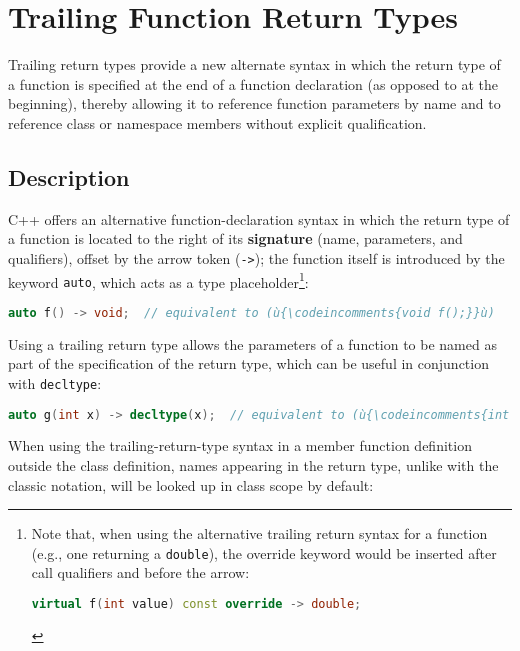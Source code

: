 \newpage
\section[Trailing Function Return Types]{Trailing Function Return Types}\label{trailing-function-return-types}


Trailing return types provide a new alternate syntax in which the return type of a function is specified at
the end of a function declaration (as opposed to at the beginning),
thereby allowing it to reference function parameters by name and to reference class
or namespace members without explicit qualification.

\subsection[Description]{Description}\label{description}

C++ offers an alternative function-declaration syntax in which the
return type of a function is located to the right of its
\textbf{signature} (name, parameters, and qualifiers), offset by the
arrow token (\texttt{->}); the function itself is introduced by the
keyword {\texttt{auto}}, which acts as a type placeholder\cprotect\footnote{Note that, when using the alternative trailing return syntax for a function (e.g., one returning a \texttt{double}), the override keyword would be inserted after call qualifiers and before the arrow:

\begin{lstlisting}[language=C++,basicstyle=\ttfamily\footnotesize]
virtual f(int value) const override -> double;
\end{lstlisting}\vspace*{-1ex}}:

\begin{lstlisting}[language=C++]
auto f() -> void;  // equivalent to (ù{\codeincomments{void f();}}ù)
\end{lstlisting}

\noindent Using a trailing return type allows the parameters of a function to be
named as part of the specification of the return type, which can be
useful in conjunction with {\texttt{decltype}}:

\begin{lstlisting}[language=C++]
auto g(int x) -> decltype(x);  // equivalent to (ù{\codeincomments{int g(int x);}}ù)
\end{lstlisting}

\noindent When using the trailing-return-type syntax in a member function
definition outside the class definition, names appearing in the return
type, unlike with the classic notation, will be looked up in class scope
by default:

